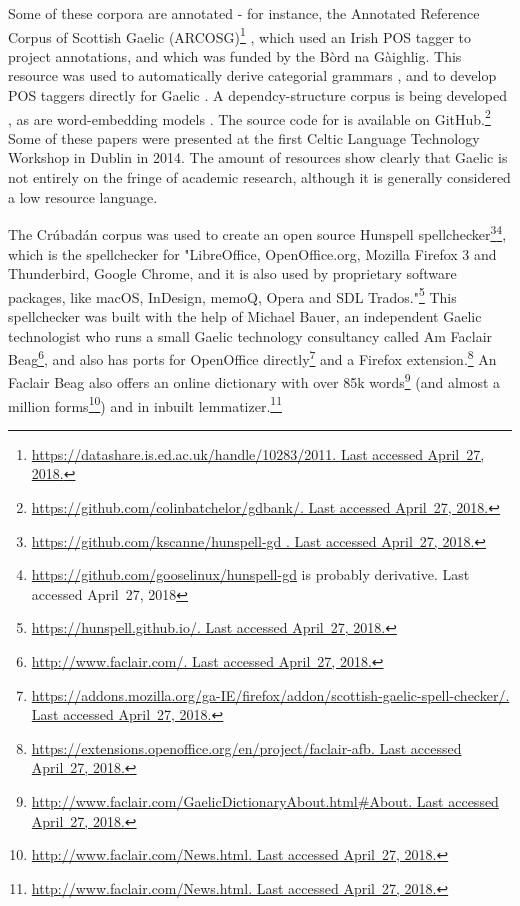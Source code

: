 Some of these corpora are annotated - for instance, the Annotated Reference Corpus of Scottish Gaelic (ARCOSG)\footnote{\href{https://datashare.is.ed.ac.uk/handle/10283/2011}{https://datashare.is.ed.ac.uk/handle/10283/2011. Last accessed April~27, 2018.}} \citep{ARCOSG2016, lamb2014scottish}, which used an Irish POS tagger \citep{ui2006part} to project annotations, and which was funded by the B\`ord na G\`aighlig. This resource was used to automatically derive categorial grammars \citep{batchelor2016automatic}, and to develop POS taggers directly for Gaelic \citep{lamb2014developing}. A dependcy-structure corpus is being developed \citep{batchelor2014gdbank}, as are word-embedding models \citep{lamb2016developing}. The source code for \citet{batchelor2014gdbank, batchelor2016automatic} is available on GitHub.\footnote{\href{https://github.com/colinbatchelor/gdbank/}{https://github.com/colinbatchelor/gdbank/. Last accessed April~27, 2018.}} Some of these papers were presented at the first Celtic Language Technology Workshop in Dublin in 2014. The amount of resources show clearly that Gaelic is not entirely on the fringe of academic research, although it is generally considered a low resource language. 

The Cr\'ubad\'an corpus was used to create an open source Hunspell spellchecker\footnote{\href{https://github.com/kscanne/hunspell-gd }{https://github.com/kscanne/hunspell-gd . Last accessed April~27, 2018.}}\footnote{\href{https://github.com/gooselinux/hunspell-gd}{https://github.com/gooselinux/hunspell-gd} is probably derivative. Last accessed April~27, 2018}, which is the spellchecker for "LibreOffice, OpenOffice.org, Mozilla Firefox 3 and Thunderbird, Google Chrome, and it is also used by proprietary software packages, like macOS, InDesign, memoQ, Opera and SDL Trados."\footnote{\href{https://hunspell.github.io/}{https://hunspell.github.io/. Last accessed April~27, 2018.}} This spellchecker was built with the help of Michael Bauer, an independent Gaelic technologist who runs a small Gaelic technology consultancy called Am Faclair Beag\footnote{\href{http://www.faclair.com/}{http://www.faclair.com/. Last accessed April~27, 2018.}}, and also has ports for OpenOffice directly\footnote{\href{https://addons.mozilla.org/ga-IE/firefox/addon/scottish-gaelic-spell-checker/}{https://addons.mozilla.org/ga-IE/firefox/addon/scottish-gaelic-spell-checker/. Last accessed April~27, 2018.}} and a Firefox extension.\footnote{\href{https://extensions.openoffice.org/en/project/faclair-afb}{https://extensions.openoffice.org/en/project/faclair-afb. Last accessed April~27, 2018.}} An Faclair Beag also offers an online dictionary with over 85k words\footnote{\href{http://www.faclair.com/GaelicDictionaryAbout.html\#About}{http://www.faclair.com/GaelicDictionaryAbout.html\#About. Last accessed April~27, 2018.}} 
 (and almost a million forms\footnote{\href{http://www.faclair.com/News.html}{http://www.faclair.com/News.html. Last accessed April~27, 2018.}}) and in inbuilt lemmatizer.\footnote{\href{http://www.faclair.com/News.html}{http://www.faclair.com/News.html. Last accessed April~27, 2018.}} 
 
